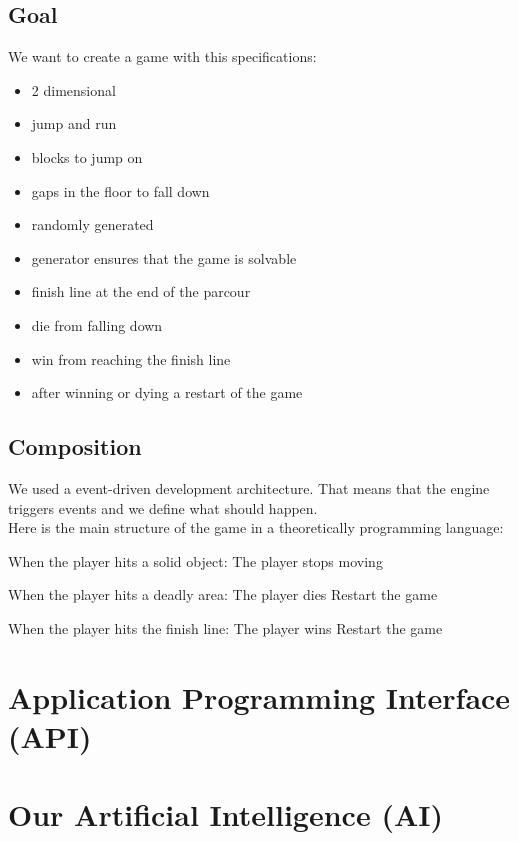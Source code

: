 \documentclass[DIV=calc, paper=a4, fontsize=11pt, twocolumn]{scrreprt}	 %
\begin{document}
        \subsection{Goal}
        We want to create a game with this specifications:
        \begin{itemize}
          \item 2 dimensional
          \item jump and run
          \item blocks to jump on
          \item gaps in the floor to fall down
          \item randomly generated
          \item generator ensures that the game is solvable
          \item finish line at the end of the parcour
          \item die from falling down
          \item win from reaching the finish line
          \item after winning or dying a restart of the game
        \end{itemize}
        \subsection{Composition}
        We used a event-driven development architecture. That means that the engine triggers events and we define what should happen.\\
        Here is the main structure of the game in a theoretically programming language:
        \begin{verbatimtab}
  When the player hits a solid object:
    The player stops moving

  When the player hits a deadly area:
    The player dies
    Restart the game

  When the player hits the finish line:
    The player wins
    Restart the game
        \end{verbatimtab}


        \section{Application Programming Interface (API)}

        \section{Our Artificial Intelligence (AI)}
\end{document}
